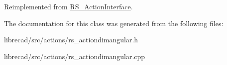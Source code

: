 Reimplemented from \hyperlink{classRS__ActionInterface_a16c2d17c24c1131d88360abbdfcc1d63}{R\-S\-\_\-\-Action\-Interface}.



The documentation for this class was generated from the following files\-:\begin{DoxyCompactItemize}
\item 
librecad/src/actions/rs\-\_\-actiondimangular.\-h\item 
librecad/src/actions/rs\-\_\-actiondimangular.\-cpp\end{DoxyCompactItemize}
